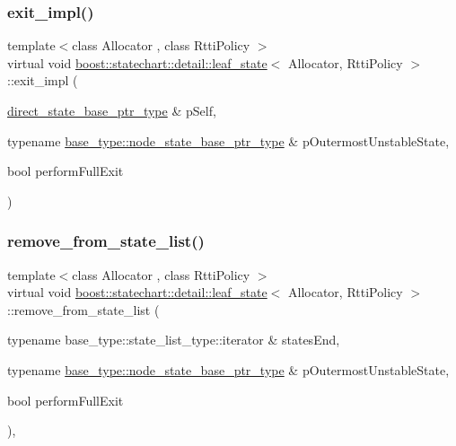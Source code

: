 \subsubsection{\texorpdfstring{exit\+\_\+impl()}{exit\_impl()}}
{\footnotesize\ttfamily template$<$class Allocator , class Rtti\+Policy $>$ \\
virtual void \mbox{\hyperlink{classboost_1_1statechart_1_1detail_1_1leaf__state}{boost\+::statechart\+::detail\+::leaf\+\_\+state}}$<$ Allocator, Rtti\+Policy $>$\+::exit\+\_\+impl (\begin{DoxyParamCaption}\item[{\mbox{\hyperlink{classboost_1_1statechart_1_1detail_1_1leaf__state_a50634727a16fd74c39340410b1e8217d}{direct\+\_\+state\+\_\+base\+\_\+ptr\+\_\+type}} \&}]{p\+Self,  }\item[{typename \mbox{\hyperlink{classboost_1_1statechart_1_1detail_1_1state__base_a8e3dd0f80bf95d7df21417a50f1dbaa1}{base\+\_\+type\+::node\+\_\+state\+\_\+base\+\_\+ptr\+\_\+type}} \&}]{p\+Outermost\+Unstable\+State,  }\item[{bool}]{perform\+Full\+Exit }\end{DoxyParamCaption})\hspace{0.3cm}{\ttfamily [pure virtual]}}

\mbox{\label{classboost_1_1statechart_1_1detail_1_1leaf__state_ad4f87bfe7bc7c28fa0f486ed13ae3500}} 
\subsubsection{\texorpdfstring{remove\+\_\+from\+\_\+state\+\_\+list()}{remove\_from\_state\_list()}}
{\footnotesize\ttfamily template$<$class Allocator , class Rtti\+Policy $>$ \\
virtual void \mbox{\hyperlink{classboost_1_1statechart_1_1detail_1_1leaf__state}{boost\+::statechart\+::detail\+::leaf\+\_\+state}}$<$ Allocator, Rtti\+Policy $>$\+::remove\+\_\+from\+\_\+state\+\_\+list (\begin{DoxyParamCaption}\item[{typename base\+\_\+type\+::state\+\_\+list\+\_\+type\+::iterator \&}]{states\+End,  }\item[{typename \mbox{\hyperlink{classboost_1_1statechart_1_1detail_1_1state__base_a8e3dd0f80bf95d7df21417a50f1dbaa1}{base\+\_\+type\+::node\+\_\+state\+\_\+base\+\_\+ptr\+\_\+type}} \&}]{p\+Outermost\+Unstable\+State,  }\item[{bool}]{perform\+Full\+Exit }\end{DoxyParamCaption})\hspace{0.3cm}{\ttfamily [inline]}, {\ttfamily [virtual]}}

